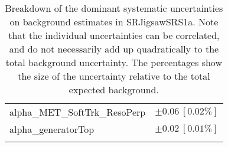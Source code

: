 \begin{table}
\begin{center}
\begin{tabular*}{\textwidth}{@{\extracolsep{\fill}}lc}
alpha\_MET\_SoftTrk\_ResoPerp         & $\pm 0.06\ [0.02\%] $       \\
alpha\_generatorTop         & $\pm 0.02\ [0.01\%] $       \\
\noalign{\smallskip}\hline\noalign{\smallskip}
\end{tabular*}
\end{center}
\caption[Breakdown of uncertainty on background estimates]{
Breakdown of the dominant systematic uncertainties on background estimates in SRJigsawSRS1a.
Note that the individual uncertainties can be correlated, and do not necessarily add up quadratically to 
the total background uncertainty. The percentages show the size of the uncertainty relative to the total expected background.
\label{table.results.bkgestimate.uncertainties.SRJigsawSRS1a}}
\end{table}
%